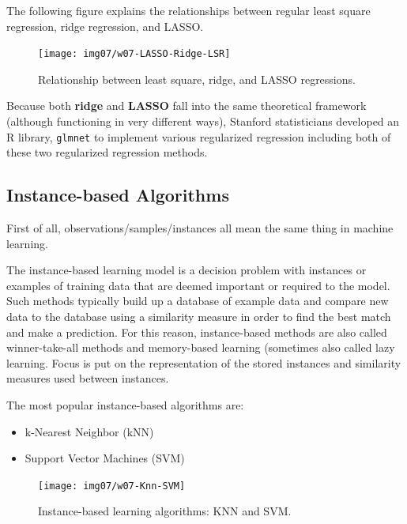 \documentclass[
]{book}
\providecommand{\tightlist}{%
  \setlength{\itemsep}{0pt}\setlength{\parskip}{0pt}}
\begin{document}
The following figure explains the relationships between regular least square regression, ridge regression, and LASSO.

\begin{figure}

{\centering \texttt{[image: img07/w07-LASSO-Ridge-LSR]} 

}

\caption{Relationship between least square, ridge, and LASSO regressions.}\label{fig:unnamed-chunk-164}
\end{figure}

Because both \textbf{ridge} and \textbf{LASSO} fall into the same theoretical framework (although functioning in very different ways), Stanford statisticians developed an R library, \texttt{glmnet} to implement various regularized regression including both of these two regularized regression methods.

\hfill\break

\hypertarget{instance-based-algorithms}{%
\subsection{Instance-based Algorithms}\label{instance-based-algorithms}}

First of all, observations/samples/instances all mean the same thing in machine learning.

The instance-based learning model is a decision problem with instances or examples of training data that are deemed important or required to the model. Such methods typically build up a database of example data and compare new data to the database using a similarity measure in order to find the best match and make a prediction. For this reason, instance-based methods are also called winner-take-all methods and memory-based learning (sometimes also called lazy learning. Focus is put on the representation of the stored instances and similarity measures used between instances.

The most popular instance-based algorithms are:

\begin{itemize}
\tightlist
\item
  k-Nearest Neighbor (kNN)
\item
  Support Vector Machines (SVM)
\end{itemize}

\begin{figure}

{\centering \texttt{[image: img07/w07-Knn-SVM]} 

}

\caption{Instance-based learning algorithms: KNN and SVM.}\label{fig:unnamed-chunk-165}
\end{figure}
\end{document}
